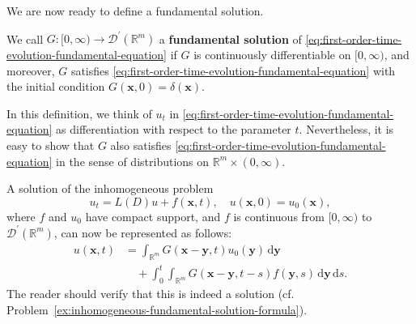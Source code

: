 We are now ready to define a fundamental solution.

\begin{Definition}
\label{def:evolution-fundamental-solution}
We call $G:[0,\infty)\to\mathcal{D}^{\prime}(\mathbb{R}^m)$ a \textbf{fundamental solution} of \eqref{eq:first-order-time-evolution-fundamental-equation} if $G$ is continuously differentiable on $[0,\infty)$, and moreover, $G$ satisfies \eqref{eq:first-order-time-evolution-fundamental-equation} with the initial condition $G(\bm{x},0)=\delta(\bm{x})$.
\end{Definition}

In this definition, we think of $u_t$ in \eqref{eq:first-order-time-evolution-fundamental-equation} as differentiation with respect to the parameter $t$. Nevertheless, it is easy to show that $G$ also satisfies \eqref{eq:first-order-time-evolution-fundamental-equation} in the sense of distributions on $\mathbb{R}^m\times(0,\infty)$.

A solution of the inhomogeneous problem
\begin{equation}\label{eq:first-order-evolution-inhomogeneous-initial-problem}
u_t=L(D)u+f(\bm{x},t),\quad u(\bm{x},0)=u_0(\bm{x}),
\end{equation}
where $f$ and $u_0$ have compact support, and $f$ is continuous from $[0,\infty)$ to $\mathcal{D}^{\prime}(\mathbb{R}^m)$, can now be represented as follows:
\begin{equation}\label{eq:first-order-evolution-fundamental-solution-formula}
\begin{aligned}
u(\bm{x},t)&=\int_{\mathbb{R}^m}G(\bm{x}-\bm{y},t)u_0(\bm{y})\,\mathrm{d}\bm{y}\\
&\quad+\int_0^t\int_{\mathbb{R}^m}G(\bm{x}-\bm{y},t-s)f(\bm{y},s)\,\mathrm{d}\bm{y}\,\mathrm{d}s.
\end{aligned}
\end{equation}
The reader should verify that this is indeed a solution (cf. Problem~\ref{ex:inhomogeneous-fundamental-solution-formula}).

